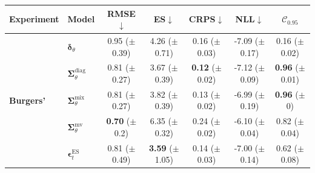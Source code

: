  \begin{tabular}{|l|l|ccccc|}
    \toprule
        Experiment & Model & RMSE$\downarrow$ & ES$\downarrow$ & CRPS$\downarrow$ & NLL$\downarrow$ & $\mathcal{C}_{0.95}$ \\
        \midrule
        \multirow{8}{*}{\textbf{Burgers'}}
        & $\bm\delta_\theta$ & \makecell{0.95 \\ ($\pm$ 0.39)} & \makecell{4.26 \\ ($\pm$ 0.71)} & \makecell{0.16 \\ ($\pm$ 0.03)} & \makecell{-7.09 \\ ($\pm$ 0.17)} & \makecell{0.16 \\ ($\pm$ 0.02)} \\
        & $\bm\Sigma_\theta^{\mathrm{diag}}$ & \makecell{0.81 \\ ($\pm$ 0.27)} & \makecell{3.67 \\ ($\pm$ 0.39)} & \makecell{\textbf{0.12} \\ ($\pm$ 0.02)} & \makecell{-7.12 \\ ($\pm$ 0.09)} & \makecell{\textbf{0.96} \\ ($\pm$ 0.01)} \\
        & $\bm\Sigma_\theta^{\mathrm{mix}}$ & \makecell{0.81 \\ ($\pm$ 0.27)} & \makecell{3.82 \\ ($\pm$ 0.39)} & \makecell{0.13 \\ ($\pm$ 0.02)} & \makecell{-6.99 \\ ($\pm$ 0.19)} & \makecell{\textbf{0.96} \\ ($\pm$ 0)} \\
        & $\bm\Sigma_\theta^{\mathrm{mv}}$ & \makecell{\textbf{0.70} \\ ($\pm$ 0.2)} & \makecell{6.35 \\ ($\pm$ 0.32)} & \makecell{0.24 \\ ($\pm$ 0.02)} & \makecell{-6.10 \\ ($\pm$ 0.04)} & \makecell{0.82 \\ ($\pm$ 0.04)} \\
        & $\bm\epsilon_t^\mathrm{ES}$ & \makecell{0.81 \\ ($\pm$ 0.49)} & \makecell{\textbf{3.59} \\ ($\pm$ 1.05)} & \makecell{0.14 \\ ($\pm$ 0.03)} & \makecell{-7.00 \\ ($\pm$ 0.14)} & \makecell{0.62 \\ ($\pm$ 0.08)} \\

\end{tabular}
